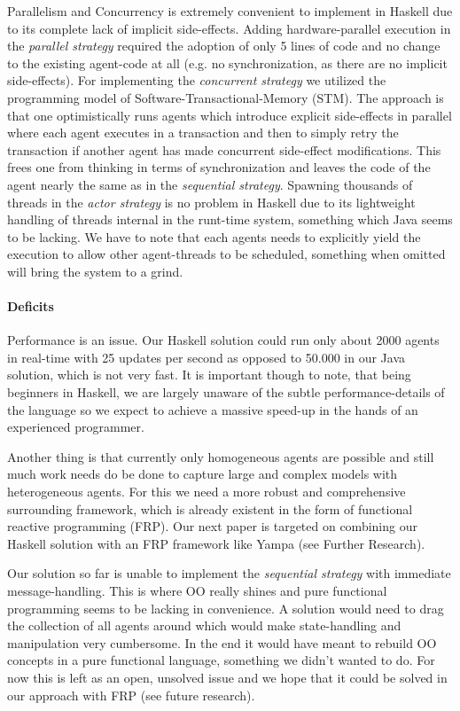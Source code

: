Parallelism and Concurrency is extremely convenient to implement in Haskell due to its complete lack of implicit side-effects. Adding hardware-parallel execution in the \textit{parallel strategy} required the adoption of only 5 lines of code and no change to the existing agent-code at all (e.g. no synchronization, as there are no implicit side-effects). For implementing the \textit{concurrent strategy} we utilized the programming model of Software-Transactional-Memory (STM). The approach is that one optimistically runs agents which introduce explicit side-effects in parallel where each agent executes in a transaction and then to simply retry the transaction if another agent has made concurrent side-effect modifications. This frees one from thinking in terms of synchronization and leaves the code of the agent nearly the same as in the \textit{sequential strategy}. 
Spawning thousands of threads in the \textit{actor strategy} is no problem in Haskell due to its lightweight handling of threads internal in the runt-time system, something which Java seems to be lacking. We have to note that each agents needs to explicitly yield the execution to allow other agent-threads to be scheduled, something when omitted will bring the system to a grind.

\paragraph{Deficits}
Performance is an issue. Our Haskell solution could run only about 2000 agents in real-time with 25 updates per second as opposed to 50.000 in our Java solution, which is not very fast. It is important though to note, that being beginners in Haskell, we are largely unaware of the subtle performance-details of the language so we expect to achieve a massive speed-up in the hands of an experienced programmer.

Another thing is that currently only homogeneous agents are possible and still much work needs do be done to capture large and complex models with heterogeneous agents. For this we need a more robust and comprehensive surrounding framework, which is already existent in the form of functional reactive programming (FRP). Our next paper is targeted on combining our Haskell solution with an FRP framework like Yampa (see Further Research). 

Our solution so far is unable to implement the \textit{sequential strategy} with immediate message-handling. This is where OO really shines and pure functional programming seems to be lacking in convenience. A solution would need to drag the collection of all agents around which would make state-handling and manipulation very cumbersome. In the end it would have meant to rebuild OO concepts in a pure functional language, something we didn't wanted to do. For now this is left as an open, unsolved issue and we hope that it could be solved in our approach with FRP (see future research).

